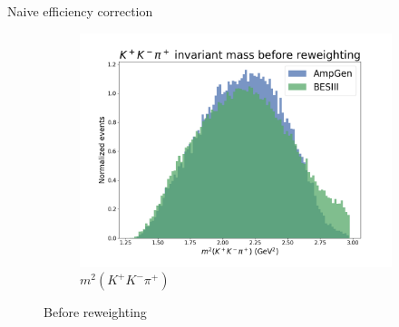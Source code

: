 \documentclass{beamer}
\begin{document}
\begin{frame}{Naive efficiency correction}
\begin{figure}
\begin{subfigure}{0.33\textwidth}
      \includegraphics[width = 1.0\textwidth]{Plots/s012_BeforeReweighting.png}
      \caption{$m^2(K^+K^-\pi^+)$}
    \end{subfigure}
    \caption{Before reweighting}
  \end{figure}
\end{frame}
\end{document}
